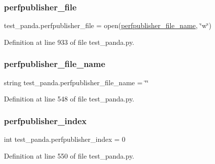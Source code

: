 \subsubsection{\texorpdfstring{perfpublisher\+\_\+file}{perfpublisher\_file}}
{\footnotesize\ttfamily test\+\_\+panda.\+perfpublisher\+\_\+file = open(\hyperlink{namespacetest__panda_ae3bf09732ecacf6c06a7180d67d25a9e}{perfpublisher\+\_\+file\+\_\+name}, \char`\"{}w\char`\"{})}



Definition at line 933 of file test\+\_\+panda.\+py.

\mbox{\label{namespacetest__panda_ae3bf09732ecacf6c06a7180d67d25a9e}} 
\subsubsection{\texorpdfstring{perfpublisher\+\_\+file\+\_\+name}{perfpublisher\_file\_name}}
{\footnotesize\ttfamily string test\+\_\+panda.\+perfpublisher\+\_\+file\+\_\+name = \char`\"{}\char`\"{}}



Definition at line 548 of file test\+\_\+panda.\+py.

\mbox{\label{namespacetest__panda_a3dbe52cf1db39231763a58776376a670}} 
\subsubsection{\texorpdfstring{perfpublisher\+\_\+index}{perfpublisher\_index}}
{\footnotesize\ttfamily int test\+\_\+panda.\+perfpublisher\+\_\+index = 0}



Definition at line 550 of file test\+\_\+panda.\+py.

\mbox{\label{namespacetest__panda_adfd44e99cf4192d4d665015174c44fd0}} 

